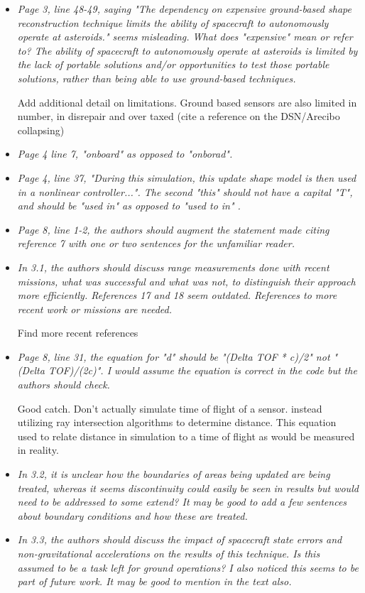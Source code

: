 \documentclass[11pt]{article}
\newcommand{\comment}[1]{\item \itshape #1 \normalfont}
\begin{document}
\begin{itemize}
\comment{
Page 3, line 48-49, saying "The dependency on expensive ground-based shape reconstruction technique limits the ability of spacecraft to autonomously operate at asteroids." seems misleading. What does "expensive" mean or refer to? The ability of spacecraft to autonomously operate at asteroids is limited by the lack of portable solutions and/or opportunities to test those portable solutions, rather than being able to use ground-based techniques.
}

Add additional detail on limitations. 
Ground based sensors are also limited in number, in disrepair and over taxed (cite a reference on the DSN/Arecibo collapsing)

\comment{
Page 4 line 7, "onboard" as opposed to "onborad".
}

\comment{
Page 4, line 37, "During this simulation, this update shape model is then used in a nonlinear controller...". The second "this" should not have a capital "T", and should be "used in" as opposed to "used to in" .
}

\comment{
Page 8, line 1-2, the authors should augment the statement made citing reference 7 with one or two sentences for the unfamiliar reader.  
}

\comment{
In 3.1, the authors should discuss range measurements done with recent missions, what was successful and what was not, to distinguish their approach more efficiently. 
References 17 and 18 seem outdated. References to more recent work or missions are needed.
}

Find more recent references

\comment{
Page 8, line 31, the equation for "d" should be "(Delta TOF * c)/2" not "(Delta TOF)/(2c)". I would assume the equation is correct in the code but the authors should check.
}

Good catch. 
Don't actually simulate time of flight of a sensor. 
instead utilizing ray intersection algorithms to determine distance. 
This equation used to relate distance in simulation to a time of flight as would be measured in reality.

\comment{
In 3.2, it is unclear how the boundaries of areas being updated are being treated, whereas it seems discontinuity could easily be seen in results but would need to be addressed to some extend? It may be good to add a few sentences about boundary conditions and how these are treated.
}

\comment{
In 3.3, the authors should discuss the impact of spacecraft state errors and non-gravitational accelerations on the results of this technique. Is this assumed to be a task left for ground operations?
I also noticed this seems to be part of future work. It may be good to mention in the text also.
}


\end{itemize}
\end{document}
